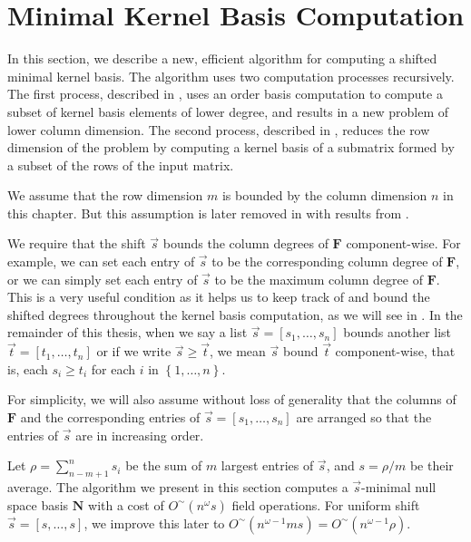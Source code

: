 
\section{Minimal Kernel Basis Computation}

\label{sec:Nullspace-Basis-Computation}

In this section, we describe a new, efficient algorithm for computing
a shifted minimal kernel basis. The algorithm uses two computation
processes recursively. The first process, described in ,
uses an order basis computation to compute a subset of kernel basis
elements of lower degree, and results in a new problem of lower column
dimension. The second process, described in ,
reduces the row dimension of the problem by computing a kernel basis
of a submatrix formed by a subset of the rows of the input matrix.

We assume that the row dimension $m$ is bounded by the column dimension
$n$ in this chapter. But this assumption is later removed in 
with results from .

We require that the shift $\vec{s}$ bounds the column degrees of
$\mathbf{F}$ component-wise. For example, we can set each entry of
$\vec{s}$ to be the corresponding column degree of $\mathbf{F}$,
or we can simply set each entry of $\vec{s}$ to be the maximum column
degree of $\mathbf{F}$. %
 This is a very useful condition as it helps us to keep track of and
bound the shifted degrees throughout the kernel basis computation,
as we will see in . In the remainder
of this thesis, when we say a list $\vec{s}=\left[s_{1},\dots,s_{n}\right]$
bounds another list $\vec{t}=\left[t_{1},\dots,t_{n}\right]$ or if
we write $\vec{s}\ge\vec{t}$, we mean $\vec{s}$ bound $\vec{t}$
component-wise, that is, each $s_{i}\ge t_{i}$ for each $i$ in $\left\{ 1,\dots,n\right\} $. 

For simplicity, we will also assume without loss of generality that
the columns of $\mathbf{F}$ and the corresponding entries of $\vec{s}=\left[s_{1},\dots,s_{n}\right]$
are arranged so that the entries of $\vec{s}$ are in increasing order.

Let $\rho=\sum_{n-m+1}^{n}s_{i}$ be the sum of $m$ largest entries
of $\vec{s}$, and $s=\rho/m$ be their average. The algorithm we
present in this section computes a $\vec{s}$-minimal null space basis
$\mathbf{N}$ with a cost of $O^{\sim}(n^{\omega}s)$ field operations.
For uniform shift $\vec{s}=\left[s,\dots,s\right]$, we improve this
later to $O^{\sim}\left(n^{\omega-1}ms\right)=O^{\sim}\left(n^{\omega-1}\rho\right)$.


